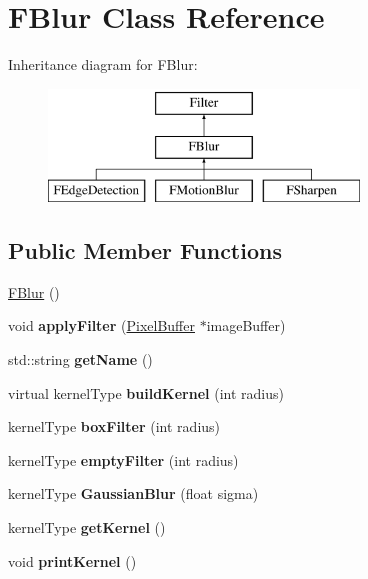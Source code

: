 \hypertarget{classFBlur}{\section{F\-Blur Class Reference}
\label{classFBlur}
}
Inheritance diagram for F\-Blur\-:\begin{figure}[H]
\begin{center}
\leavevmode
\includegraphics[height=3.000000cm]{classFBlur}
\end{center}
\end{figure}
\subsection*{Public Member Functions}
\begin{DoxyCompactItemize}
\item 
\hyperlink{classFBlur_a21af159e46bb29908e80b73f09a159df}{F\-Blur} ()
\item 
\hypertarget{classFBlur_a20d9f9bb8f2b787273a860779853a8fd}{void {\bfseries apply\-Filter} (\hyperlink{classPixelBuffer}{Pixel\-Buffer} $\ast$image\-Buffer)}\label{classFBlur_a20d9f9bb8f2b787273a860779853a8fd}

\item 
\hypertarget{classFBlur_a3c121581f48e00e0267f88826808ee23}{std\-::string {\bfseries get\-Name} ()}\label{classFBlur_a3c121581f48e00e0267f88826808ee23}

\item 
\hypertarget{classFBlur_ad7d9aa0fa6b3b4f4ead1545ccf6a6628}{virtual kernel\-Type {\bfseries build\-Kernel} (int radius)}\label{classFBlur_ad7d9aa0fa6b3b4f4ead1545ccf6a6628}

\item 
\hypertarget{classFBlur_a97ca2bede17042bae70d781859d46e73}{kernel\-Type {\bfseries box\-Filter} (int radius)}\label{classFBlur_a97ca2bede17042bae70d781859d46e73}

\item 
\hypertarget{classFBlur_ab13f7d8c36423e3f0ecabdcd9b045fbf}{kernel\-Type {\bfseries empty\-Filter} (int radius)}\label{classFBlur_ab13f7d8c36423e3f0ecabdcd9b045fbf}

\item 
\hypertarget{classFBlur_ad88afc728cb9b8c84443a0bf4a30983f}{kernel\-Type {\bfseries Gaussian\-Blur} (float sigma)}\label{classFBlur_ad88afc728cb9b8c84443a0bf4a30983f}

\item 
\hypertarget{classFBlur_a7cb16fe19cd319be83d95de5686e8d39}{kernel\-Type {\bfseries get\-Kernel} ()}\label{classFBlur_a7cb16fe19cd319be83d95de5686e8d39}

\item 
\hypertarget{classFBlur_a5f500e9bad040039fb43e58be03d57e6}{void {\bfseries print\-Kernel} ()}\label{classFBlur_a5f500e9bad040039fb43e58be03d57e6}

\end{DoxyCompactItemize}

